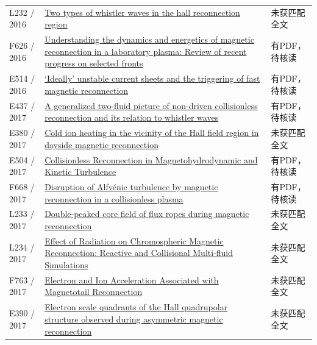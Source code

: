 \begin{longtable}{P{24mm}P{97mm}P{27mm}}
L232 / 2016 & \href{https://doi.org/10.1002/2016ja022650}{Two types of whistler waves in the hall reconnection region} & 未获匹配全文\\

F626 / 2016 & \href{https://doi.org/10.1063/1.4948721}{Understanding the dynamics and energetics of magnetic reconnection in a laboratory plasma: Review of recent progress on selected fronts} & 有PDF，待核读\\

E514 / 2016 & \href{https://doi.org/10.1017/s002237781600088x}{‘Ideally’ unstable current sheets and the triggering of fast magnetic reconnection} & 有PDF，待核读\\

E437 / 2017 & \href{https://doi.org/10.1063/1.4982812}{A generalized two-fluid picture of non-driven collisionless reconnection and its relation to whistler waves} & 有PDF，待核读\\

E380 / 2017 & \href{https://confit.atlas.jp/guide/event/jpguagu2017/subject/PEM13-03/detail}{Cold ion heating in the vicinity of the Hall field region in dayside magnetic reconnection} & 未获匹配全文\\

E504 / 2017 & \href{https://doi.org/10.3847/1538-4357/aa9754}{Collisionless Reconnection in Magnetohydrodynamic and Kinetic Turbulence} & 有PDF，待核读\\

F668 / 2017 & \href{https://doi.org/10.1017/s0022377817000812}{Disruption of Alfvénic turbulence by magnetic reconnection in a collisionless plasma} & 有PDF，待核读\\

L233 / 2017 & \href{https://doi.org/10.1002/2017ja024233}{Double‐peaked core field of flux ropes during magnetic reconnection} & 未获匹配全文\\

L234 / 2017 & \href{https://doi.org/10.3847/1538-4357/aa7554}{Effect of Radiation on Chromospheric Magnetic Reconnection: Reactive and Collisional Multi-fluid Simulations} & 未获匹配全文\\

F763 / 2017 & \href{https://escholarship.org/uc/item/0kf95194}{Electron and Ion Acceleration Associated with Magnetotail Reconnection} & 未获匹配全文\\

E390 / 2017 & \href{https://ui.adsabs.harvard.edu/abs/2019EGUGA..21.6241W/abstract}{Electron scale quadrants of the Hall quadrupolar structure observed during asymmetric magnetic reconnection} & 未获匹配全文\\


\end{longtable}

